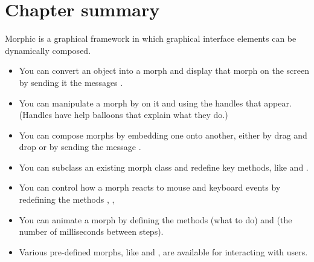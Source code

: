 \documentclass[a4paper,10pt,twoside]{book}
\begin{document}


\section{Chapter summary}

Morphic is a graphical framework in which graphical interface elements can be dynamically composed.

\begin{itemize}
  \item You can convert an object into a morph and display that morph on the screen by sending it the messages .
  \item You can manipulate a morph by  on it and using the handles that appear. (Handles have help balloons that explain what they do.)
  \item You can compose morphs by embedding one onto another, either by drag and drop or by sending the message .
  \item You can subclass an existing morph class and redefine key methods, like  and .
  \item You can control how a morph reacts to mouse and keyboard events by redefining the methods , , \etc
  \item You can animate a morph by defining the methods  (what to do) and  (the number of milliseconds between steps).
  \item Various pre-defined morphs, like  and , are available for interacting with users.
\end{itemize}

\ifx\wholebook\relax\else
\end{document}
